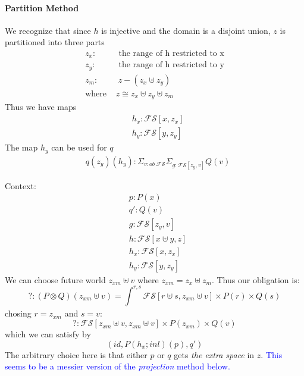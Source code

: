 \documentclass{article}
\newcommand{\blue}[1]{\textcolor{blue}{#1}}
\begin{document}
\paragraph{Partition Method}
We recognize that since $h$ is injective and the domain is a disjoint union, $z$ is partitioned into three parts
\begin{align*}
    z_x :& \textrm{ the range of h restricted to x}\\
    z_y :& \textrm{ the range of h restricted to y}\\
    z_m :& \; z - (z_x \uplus z_y)\\
    \textrm{where } & z \cong z_x \uplus z_y \uplus z_m
\end{align*}
Thus we have maps
\begin{align*}
    &h_x: \mathcal{FS}[x , z_x]\\
    &h_y: \mathcal{FS}[y , z_y]
\end{align*}
The map $h_y$ can be used for $q$
\begin{align*}
        &q(z_y)(h_y) : \Sigma_{v : ob \;\mathcal{FS}}\Sigma_{g : \mathcal{FS}[ z_y , v ]}Q(v)
\end{align*}

Context:
\begin{align*}
    &p : P(x)\\
    &q' : Q(v)\\
    &g : \mathcal{FS}[ z_y , v ]\\
    &h : \mathcal{FS}[x\uplus y , z]\\
    &h_x: \mathcal{FS}[x , z_x]\\
    &h_y: \mathcal{FS}[y , z_y]
\end{align*}
We can choose future world $z_{xm} \uplus v$ where $z_{xm} = z_x \uplus z_m$.
Thus our obligation is:
\[
    ? : (P \otimes Q)(z_{xm} \uplus v) = \int_{}^{r,s} \mathcal{FS}[r \uplus s,z_{xm} \uplus v ] 
    \times P(r) \times Q(s)
\]
chosing $r = z_{xm}$ and $s = v$:
\[
    ? : \mathcal{FS}[z_{xm} \uplus v,z_{xm} \uplus v ] \times P(z_{xm}) \times Q(v)
\]
which we can satisfy by 
\[
  (id, P(h_x ; inl)(p), q')  
\]
The arbitrary choice here is that either $p$ or $q$ gets \textit{the extra space} in $z$.
\blue{This seems to be a messier version of the \textit{projection} method below. }
\end{document}
